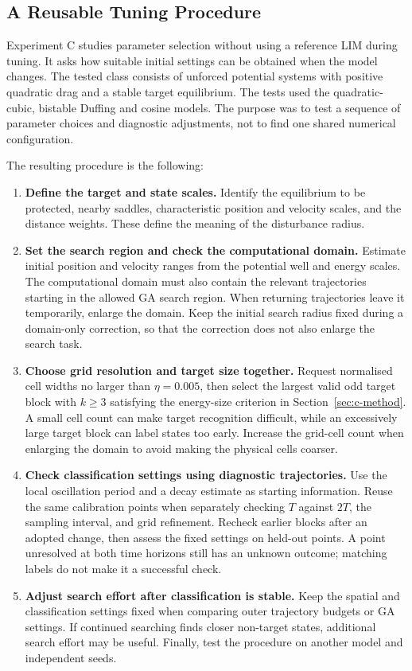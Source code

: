 \subsection{A Reusable Tuning Procedure}

\begin{revision}
Experiment C studies parameter selection without using a reference LIM during tuning. It asks how suitable initial settings can be obtained when the model changes. The tested class consists of unforced potential systems with positive quadratic drag and a stable target equilibrium. The tests used the quadratic-cubic, bistable Duffing and cosine models. The purpose was to test a sequence of parameter choices and diagnostic adjustments, not to find one shared numerical configuration.
\end{revision}

The resulting procedure is the following:
\begin{enumerate}[label=\arabic*.]
\item \textbf{Define the target and state scales.} Identify the equilibrium to be protected, nearby saddles, characteristic position and velocity scales, and the distance weights. These define the meaning of the disturbance radius.
\item \textbf{Set the search region and check the computational domain.} Estimate initial position and velocity ranges from the potential well and energy scales. The computational domain must also contain the relevant trajectories starting in the allowed GA search region. When returning trajectories leave it temporarily, enlarge the domain. Keep the initial search radius fixed during a domain-only correction, so that the correction does not also enlarge the search task.
\item \textbf{Choose grid resolution and target size together.} Request normalised cell widths no larger than $\eta=0.005$, then select the largest valid odd target block with $k\geq3$ satisfying the energy-size criterion in Section~\ref{sec:c-method}. A small cell count can make target recognition difficult, while an excessively large target block can label states too early. Increase the grid-cell count when enlarging the domain to avoid making the physical cells coarser.
\item \textbf{Check classification settings using diagnostic trajectories.} Use the local oscillation period and a decay estimate as starting information. Reuse the same calibration points when separately checking $T$ against $2T$, the sampling interval, and grid refinement. Recheck earlier blocks after an adopted change, then assess the fixed settings on held-out points. A point unresolved at both time horizons still has an unknown outcome; matching labels do not make it a successful check.
\item \textbf{Adjust search effort after classification is stable.} Keep the spatial and classification settings fixed when comparing outer trajectory budgets or GA settings. If continued searching finds closer non-target states, additional search effort may be useful. Finally, test the procedure on another model and independent seeds.
\end{enumerate}

